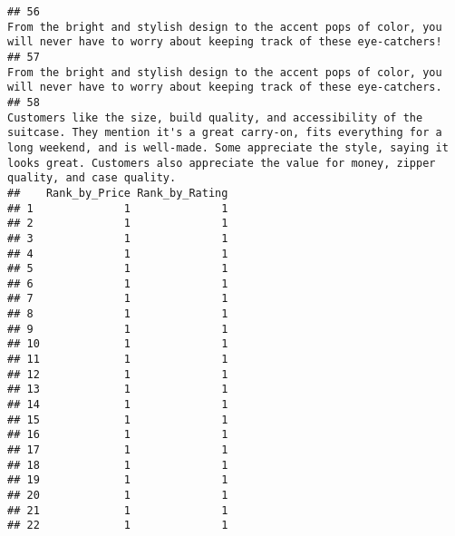 \documentclass[
]{article}
\begin{document}
\begin{verbatim}
## 56                                                                                                                                                                                                                                                                                                                                                                                                                                                                                   From the bright and stylish design to the accent pops of color, you will never have to worry about keeping track of these eye-catchers! 
## 57                                                                                                                                                                                                                                                                                                                                                                                                                                                                                   From the bright and stylish design to the accent pops of color, you will never have to worry about keeping track of these eye-catchers. 
## 58                                                                                                                                                                                                                                                                                                                    Customers like the size, build quality, and accessibility of the suitcase. They mention it's a great carry-on, fits everything for a long weekend, and is well-made. Some appreciate the style, saying it looks great. Customers also appreciate the value for money, zipper quality, and case quality.
##    Rank_by_Price Rank_by_Rating
## 1              1              1
## 2              1              1
## 3              1              1
## 4              1              1
## 5              1              1
## 6              1              1
## 7              1              1
## 8              1              1
## 9              1              1
## 10             1              1
## 11             1              1
## 12             1              1
## 13             1              1
## 14             1              1
## 15             1              1
## 16             1              1
## 17             1              1
## 18             1              1
## 19             1              1
## 20             1              1
## 21             1              1
## 22             1              1

\end{verbatim}
\end{document}
